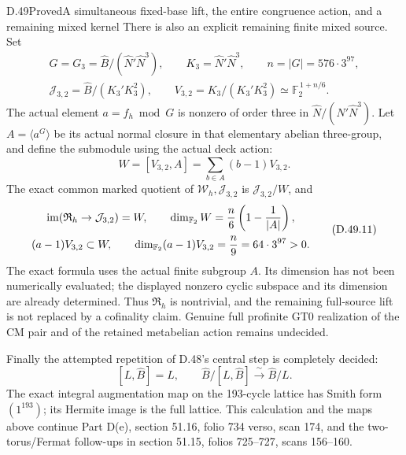 \begin{statement}{D.49}{Proved}{A simultaneous fixed-base lift, the entire congruence action, and a remaining mixed kernel}
There is also an explicit remaining finite mixed source.
Set
\[
 \begin{gathered}
 G=G_3=\widehat B/(\widehat N'\widehat N^3),
 \qquad K_3=\widehat N'\widehat N^3,\qquad n=|G|=576\cdot3^{97},\\
 \mathcal J_{3,2}=\widehat B/(K_3'K_3^2),\qquad
 V_{3,2}=K_3/(K_3'K_3^2)\simeq\mathbb F_2^{\,1+n/6}.
 \end{gathered}
 \tag{D.49.9}
\]
The actual element \(a=f_h\bmod G\) is nonzero of order
three in \(\widehat N/(\widehat N'\widehat N^3)\).
Let \(A=\langle a^G\rangle\) be its actual normal closure
in that elementary abelian three-group, and define the
submodule using the actual deck action:
\[
       W=[V_{3,2},A]
          =\sum_{b\in A}(b-1)V_{3,2}.
 \tag{D.49.10}
\]
The exact common marked quotient of
\(\mathcal W_h,\mathcal J_{3,2}\) is
\(\mathcal J_{3,2}/W\), and
\[
 \begin{gathered}
 \operatorname{im}(\mathfrak R_h\to\mathcal J_{3,2})=W,\qquad
 \dim_{\mathbb F_2}W={n\over6}\left(1-{1\over|A|}\right),\\
 (a-1)V_{3,2}\subset W,\qquad
 \dim_{\mathbb F_2}(a-1)V_{3,2}={n\over9}=64\cdot3^{97}>0.
 \end{gathered}
 \tag{D.49.11}
\]
The exact formula uses the actual finite subgroup \(A\).
Its dimension has not been numerically evaluated; the
displayed nonzero cyclic subspace and its dimension are
already determined. Thus \(\mathfrak R_h\) is nontrivial,
and the remaining full-source lift is not replaced by a
cofinality claim. Genuine full profinite GT0 realization
of the CM pair and of the retained metabelian action
remains undecided.

Finally the attempted repetition of D.48's central step
is completely decided:
\[
             [L,\widehat B]=L,\qquad
       \widehat B/[L,\widehat B]\xrightarrow{\ \sim\ }
                                      \widehat B/L.
 \tag{D.49.12}
\]
The exact integral augmentation map on the 193-cycle
lattice has Smith form \((1^{193})\); its Hermite image
is the full lattice. This calculation and the maps above
continue Part D(e), section 51.16, folio 734 verso,
scan 174, and the two-torus/Fermat follow-ups in
section 51.15, folios 725--727, scans 156--160.
\end{statement}
